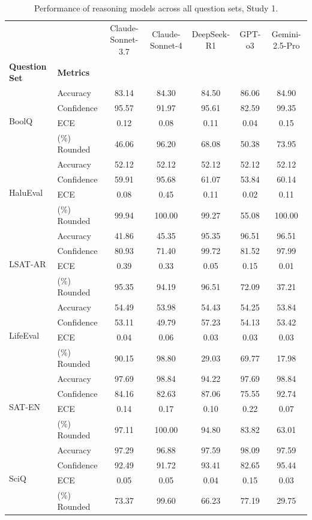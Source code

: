 \documentclass{article}
\begin{document}
\begin{appendices}
\begin{table}
    \centering
    \tiny
    \begin{tabular}{ll | ccccc}
        \toprule
         &  & Claude-Sonnet-3.7 & Claude-Sonnet-4 & DeepSeek-R1 & GPT-o3 & Gemini-2.5-Pro \\
       \textbf{ Question Set} & \textbf{Metrics} &  &  &  &  &  \\
        \midrule
        \multirow[c]{4}{*}{BoolQ} & Accuracy & 83.14 & 84.30 & 84.50 & 86.06 & 84.90 \\
         & Confidence & 95.57 & 91.97 & 95.61 & 82.59 & 99.35 \\
         & ECE & 0.12 & 0.08 & 0.11 & 0.04 & 0.15 \\
         & (\%) Rounded & 46.06 & 96.20 & 68.08 & 50.38 & 73.95 \\
         \midrule
       \multirow[c]{4}{*}{HaluEval} & Accuracy & 52.12 & 52.12  & 52.12 & 52.12 & 52.12 \\
         & Confidence & 59.91 & 95.68 & 61.07 & 53.84 & 60.14 \\
         & ECE & 0.08 & 0.45 & 0.11 & 0.02 & 0.11 \\
         & (\%) Rounded & 99.94 & 100.00 & 99.27 & 55.08 & 100.00 \\
        \midrule
        \multirow[c]{4}{*}{LSAT-AR} & Accuracy & 41.86 & 45.35 & 95.35 & 96.51 & 96.51 \\
         & Confidence & 80.93 & 71.40 & 99.72 & 81.52 & 97.99 \\
         & ECE & 0.39 & 0.33 & 0.05 & 0.15 & 0.01 \\
         & (\%) Rounded & 95.35 & 94.19 & 96.51 & 72.09 & 37.21 \\
        \midrule
        \multirow[c]{4}{*}{LifeEval} & Accuracy & 54.49 & 53.98 & 54.43 & 54.25 & 53.84 \\
         & Confidence & 53.11 & 49.79 & 57.23 & 54.13 & 53.42 \\
         & ECE & 0.04 & 0.06 & 0.03 & 0.03 & 0.03 \\
         & (\%) Rounded & 90.15 & 98.80 & 29.03 & 69.77 & 17.98 \\
        \midrule
        \multirow[c]{4}{*}{SAT-EN} & Accuracy & 97.69 & 98.84 & 94.22 & 97.69 & 98.84 \\
         & Confidence & 84.16 & 82.63 & 87.06 & 75.55 & 92.74 \\
         & ECE & 0.14 & 0.17 & 0.10 & 0.22 & 0.07 \\
         & (\%) Rounded & 97.11 & 100.00 & 94.80 & 83.82 & 63.01 \\
        \midrule
        \multirow[c]{4}{*}{SciQ} & Accuracy & 97.29 & 96.88 & 97.59 & 98.09 & 97.59 \\
         & Confidence & 92.49 & 91.72 & 93.41 & 82.65 & 95.44 \\
         & ECE & 0.05 & 0.05 & 0.04 & 0.15 & 0.03 \\
         & (\%) Rounded & 73.37 & 99.60 & 66.23 & 77.19 & 29.75 \\
        \bottomrule
    \end{tabular}
    \caption{Performance of reasoning models across all question sets, Study 1.}


\end{table}
\end{appendices}
\end{document}
